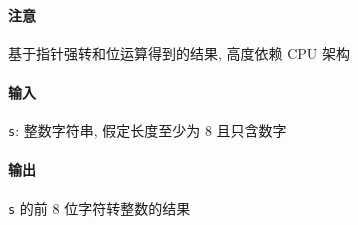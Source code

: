 \paragraph{注意}

基于指针强转和位运算得到的结果, 高度依赖 CPU 架构

\paragraph{输入}

\verb|s|: 整数字符串, 假定长度至少为 8 且只含数字

\paragraph{输出}

\verb|s| 的前 8 位字符转整数的结果
